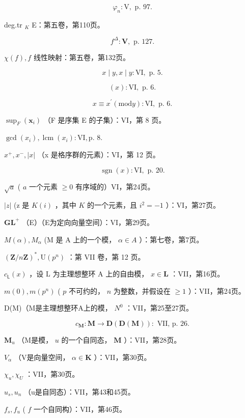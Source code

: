 \[
\varphi_ {n}: \mathrm{V}, \text { p. } 97.
\]

deg.tr \(_{K}\) E：第五卷，第110页。

\[
f ^ {\Delta}: \mathbf {V}, \text { p. } 127.
\]

\(\chi(f), f\) 线性映射：第五卷，第132页。

\[
x \mid y, x \mid y: \mathrm{VI}, \text { p. } 5.
\]

\[
(x): \mathrm{VI}, \text { p. } 6.
\]

\[
x \equiv x ^ {\prime} (\mathrm{mod} y): \mathrm{VI}, \text { p. } 6.
\]

\(\sup_{F}(\mathbf{x}_{i})\) （F 是序集 E 的子集）：VI，第 8 页。

\(\gcd (x_{i}), \operatorname{lcm}(x_{i}) : \mathrm{VI}, \text{p. 8.}\)

\(x^{+}, x^{-}, |x|\) （x 是格序群的元素）：VI，第 12 页。

\[
\operatorname{sgn} (x): \mathrm{VI}, \text { p. } 20.
\]

\(\sqrt{a}\) ( \(a\) 一个元素 \(\geqslant 0\) 有序域的）VI，第24页。

\(|z|\) (z 是 \(K(i)\) ，其中 \(K\) 的一个元素，且 \(i^2 = -1\) ）：VI，第27页。

\(\mathbf{GL}^{+}\) （E）（E为定向向量空间）：VI，第29页。

\(M(\alpha), M_{\alpha}\) (M 是 A 上的一个模， \(\alpha \in A\) ）：第七卷，第7页。

\((\mathbf{Z} / n\mathbf{Z})^{*}, \mathrm{U}(p^{n})\) ：第 VII 卷，第 12 页。

\(c_{\mathsf{L}}(x)\) ，设 L 为主理想整环 A 上的自由模， \(x\in \mathbf{L}\) ：VII，第16页。

\(m(0), m(p^n)\) ( \(p\) 不可约的， \(n\) 为整数，并假设在 \(\geqslant 1\) ）：VII，第24页。

D(M)（M是主理想整环A上的模， \(N^{0}\) ：VII，第25至27页。

\[
c _ {\mathbf {M}}: \mathbf {M} \rightarrow \mathbf {D} (\mathbf {D} (\mathbf {M})): \text { VII,   p. } 26.
\]

\(\mathbf{M}_u\) （M是模， \(u\) 的一个自同态， \(\mathbf{M}\) ）：VII，第28页。

\(V_{\alpha}\) （V是向量空间， \(\alpha \in \mathbf{K}\) ）：VII，第30页。

\(\chi_{u}, \chi_{U}\) ：VII，第30页。

\(u_{s}, u_{n}\) （u是自同态）：VII，第43和45页。

\(f_{s}, f_{u}\) ( \(f\) 一个自同构）：VII，第46页。

